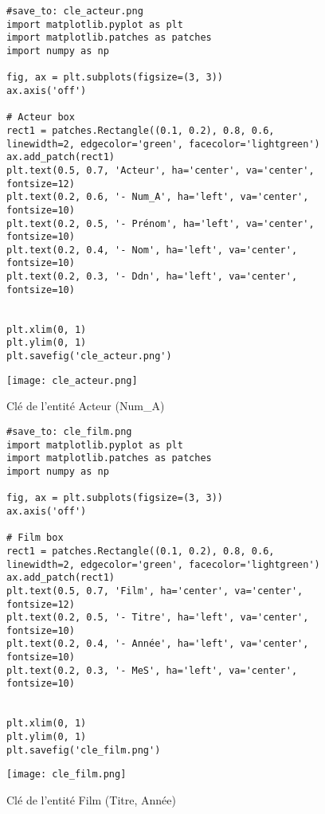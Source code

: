 \documentclass{article}
\begin{document}
\begin{figure}[H]
    \centering
    \begin{minipage}{0.45\textwidth}
        \begin{verbatim}
#save_to: cle_acteur.png
import matplotlib.pyplot as plt
import matplotlib.patches as patches
import numpy as np

fig, ax = plt.subplots(figsize=(3, 3))
ax.axis('off')

# Acteur box
rect1 = patches.Rectangle((0.1, 0.2), 0.8, 0.6, linewidth=2, edgecolor='green', facecolor='lightgreen')
ax.add_patch(rect1)
plt.text(0.5, 0.7, 'Acteur', ha='center', va='center', fontsize=12)
plt.text(0.2, 0.6, '- Num_A', ha='left', va='center', fontsize=10)
plt.text(0.2, 0.5, '- Prénom', ha='left', va='center', fontsize=10)
plt.text(0.2, 0.4, '- Nom', ha='left', va='center', fontsize=10)
plt.text(0.2, 0.3, '- Ddn', ha='left', va='center', fontsize=10)


plt.xlim(0, 1)
plt.ylim(0, 1)
plt.savefig('cle_acteur.png')

        \end{verbatim}
        \texttt{[image: cle\_acteur.png]}
        \caption{Clé de l'entité Acteur (Num\_A)}
        \label{fig:cle_acteur}
    \end{minipage}
    \hfill
    \begin{minipage}{0.45\textwidth}
        \begin{verbatim}
#save_to: cle_film.png
import matplotlib.pyplot as plt
import matplotlib.patches as patches
import numpy as np

fig, ax = plt.subplots(figsize=(3, 3))
ax.axis('off')

# Film box
rect1 = patches.Rectangle((0.1, 0.2), 0.8, 0.6, linewidth=2, edgecolor='green', facecolor='lightgreen')
ax.add_patch(rect1)
plt.text(0.5, 0.7, 'Film', ha='center', va='center', fontsize=12)
plt.text(0.2, 0.5, '- Titre', ha='left', va='center', fontsize=10)
plt.text(0.2, 0.4, '- Année', ha='left', va='center', fontsize=10)
plt.text(0.2, 0.3, '- MeS', ha='left', va='center', fontsize=10)


plt.xlim(0, 1)
plt.ylim(0, 1)
plt.savefig('cle_film.png')

        \end{verbatim}
        \texttt{[image: cle\_film.png]}
        \caption{Clé de l'entité Film (Titre, Année)}
        \label{fig:cle_film}
    \end{minipage}
\end{figure}
\end{document}
